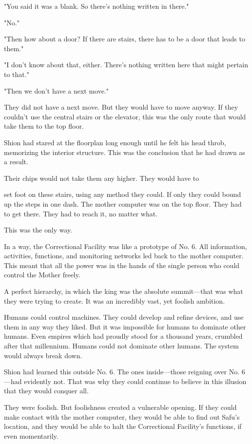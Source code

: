 "You said it was a blank. So there's nothing written in there."

"No."

"Then how about a door? If there are stairs, there has to be a door that
leads to them."

"I don't know about that, either. There's nothing written here that
might pertain to that."

"Then we don't have a next move."

They did not have a next move. But they would have to move anyway. If
they couldn't use the central stairs or the elevator, this was the only
route that would take them to the top floor.

Shion had stared at the floorplan long enough until he felt his head
throb, memorizing the interior structure. This was the conclusion that
he had drawn as a result.

Their chips would not take them any higher. They would have to~

set foot on these stairs, using any method they could. If only they
could bound up the steps in one dash. The mother computer was on the top
floor. They had to get there. They had to reach it, no matter what.

This was the only way.

In a way, the Correctional Facility was like a prototype of No. 6. All
information, activities, functions, and monitoring networks led back to
the mother computer. This meant that all the power was in the hands of
the single person who could control the Mother freely.

A perfect hierarchy, in which the king was the absolute summit---that was
what they were trying to create. It was an incredibly vast, yet foolish
ambition.

Humans could control machines. They could develop and refine devices,
and use them in any way they liked. But it was impossible for humans to
dominate other humans. Even empires which had proudly stood for a
thousand years, crumbled after that millennium. Humans could not
dominate other humans. The system would always break down.

Shion had learned this outside No. 6. The ones inside---those reigning
over No. 6---had evidently not. That was why they could continue to
believe in this illusion that they would conquer all.

They were foolish. But foolishness created a vulnerable opening. If they
could make contact with the mother computer, they would be able to find
out Safu's location, and they would be able to halt the Correctional
Facility's functions, if even momentarily.

